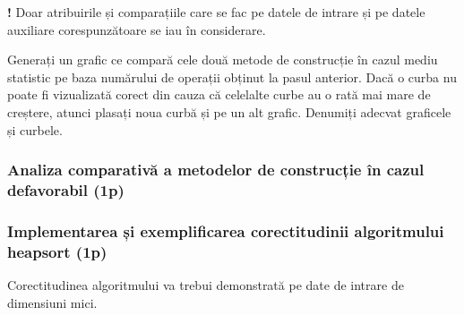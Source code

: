 \documentclass[../ro-fa-lab.tex]{subfiles}
\begin{document}
\textbf{!} Doar atribuirile și comparațiile care se fac pe datele de
intrare și pe datele auxiliare corespunzătoare se iau în considerare.

Generați un grafic ce compară cele două metode de construcție în cazul
mediu statistic pe baza numărului de operații obținut la pasul anterior.
Dacă o curba nu poate fi vizualizată corect din cauza că celelalte curbe
au o rată mai mare de creștere, atunci plasați noua curbă și pe un alt
grafic. Denumiți adecvat graficele și curbele.

\subsubsection{Analiza comparativă a metodelor de construcție în cazul
defavorabil
(1p)}\label{analiza-comparativux103-a-metodelor-de-construcux21bie-uxeen-cazul-defavorabil-1p}

\subsubsection{Implementarea și exemplificarea corectitudinii algoritmului
heapsort
(1p)}\label{implementarea-ux219i-exemplificarea-corectitudinii-algoritmului-heapsort-1p}

Corectitudinea algoritmului va trebui demonstrată pe date de intrare de
dimensiuni mici.
\end{document}
